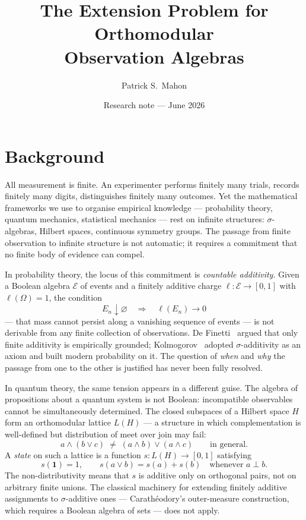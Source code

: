 \documentclass[11pt]{article}
\title{The Extension Problem for Orthomodular\\
Observation Algebras}
\author{Patrick S.\ Mahon}
\date{Research note --- June 2026}
\theoremstyle{definition}
\begin{document}
\maketitle

\section{Background}
\label{sec:background}

All measurement is finite.  An experimenter performs finitely many
trials, records finitely many digits, distinguishes finitely many
outcomes.  Yet the mathematical frameworks we use to organise
empirical knowledge --- probability theory, quantum mechanics,
statistical mechanics --- rest on infinite structures:
$\sigma$-algebras, Hilbert spaces, continuous symmetry groups.
The passage from finite observation to infinite structure is not
automatic; it requires a commitment that no finite body of
evidence can compel.

In probability theory, the locus of this commitment is
\emph{countable additivity}.  Given a Boolean algebra
$\mathcal{E}$ of events and a finitely additive charge
$\ell : \mathcal{E} \to [0,1]$ with $\ell(\Omega) = 1$,
the condition
\begin{equation}\label{eq:sigma-additivity}
  E_n \downarrow \varnothing
  \quad\Longrightarrow\quad
  \ell(E_n) \to 0
\end{equation}
--- that mass cannot persist along a vanishing sequence of events
--- is not derivable from any finite collection of observations.
De Finetti~\cite{deFinetti1974} argued that only finite additivity
is empirically grounded; Kolmogorov~\cite{Kolmogorov} adopted
$\sigma$-additivity as an axiom and built modern probability on
it.  The question of \emph{when} and \emph{why} the passage from
one to the other is justified has never been fully resolved.

In quantum theory, the same tension appears in a different guise.
The algebra of propositions about a quantum system is not Boolean:
incompatible observables cannot be simultaneously determined.  The
closed subspaces of a Hilbert space $H$ form an orthomodular
lattice $L(H)$ --- a structure in which complementation is
well-defined but distribution of meet over join may fail:
\begin{equation}\label{eq:non-distributive}
  a \wedge (b \vee c) \;\neq\; (a \wedge b) \vee (a \wedge c)
  \qquad\text{in general.}
\end{equation}
A \emph{state} on such a lattice is a function
$s : L(H) \to [0,1]$ satisfying
\begin{equation}\label{eq:state-def}
  s(\mathbf{1}) = 1,
  \qquad
  s(a \vee b) = s(a) + s(b) \quad\text{whenever } a \perp b.
\end{equation}
The non-distributivity means that $s$ is additive only on
orthogonal pairs, not on arbitrary finite unions.  The classical
machinery for extending finitely additive assignments to
$\sigma$-additive ones --- Carath\'{e}odory's outer-measure
construction, which requires a Boolean algebra of sets --- does
not apply.
\end{document}
